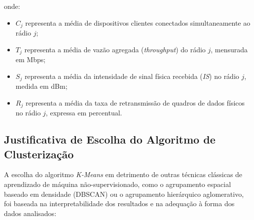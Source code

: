 onde:
\begin{itemize}
    \item $C_j$ representa a média de dispositivos clientes conectados simultaneamente ao rádio $j$;
    \item $T_j$ representa a média de vazão agregada (\textit{throughput}) do rádio $j$, mensurada em Mbps;
    \item $S_j$ representa a média da intensidade de sinal física recebida (\textit{IS}) no rádio $j$, medida em dBm;
    \item $R_j$ representa a média da taxa de retransmissão de quadros de dados físicos no rádio $j$, expressa em percentual.
\end{itemize}

\subsection{Justificativa de Escolha do Algoritmo de Clusterização}
\label{subsec:metodologia_justificativa_cluster}

A escolha do algoritmo \textit{K-Means} em detrimento de outras técnicas clássicas de aprendizado de máquina não-supervisionado, como o agrupamento espacial baseado em densidade (DBSCAN) ou o agrupamento hierárquico aglomerativo, foi baseada na interpretabilidade dos resultados e na adequação à forma dos dados analisados:

